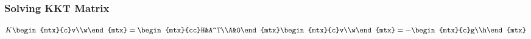 \subsubsection*{Solving KKT Matrix}
\begin{equation}
    K\begin{mtx}{c}v\\w\end{mtx}=\begin{mtx}{cc}H&A^T\\A&0\end{mtx}\begin{mtx}{c}v\\w\end{mtx}=-\begin{mtx}{c}g\\h\end{mtx}
\end{equation}
